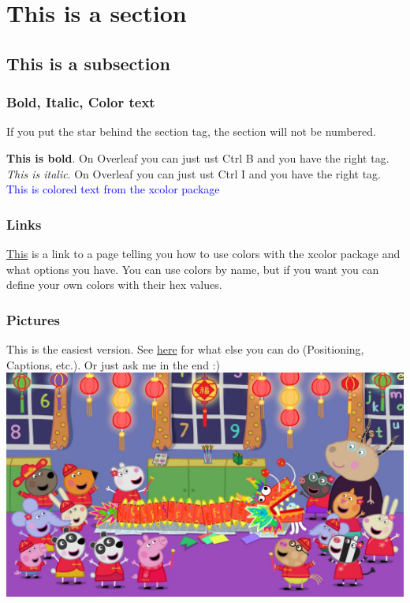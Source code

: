 \documentclass[../main.tex]{subfiles}
\begin{document}
\section{This is a section}
\subsection{This is a subsection}

\subsubsection*{Bold, Italic, Color text}

If you put the star behind the section tag, the section will not be numbered.

\textbf{This is bold}. On Overleaf you can just ust Ctrl B and you have the right tag.
\textit{This is italic}. On Overleaf you can just ust Ctrl I and you have the right tag.
\textcolor{blue}{This is colored text from the xcolor package}

\subsubsection*{Links}
 
\href{https://ftp.agdsn.de/pub/mirrors/latex/dante/macros/latex/contrib/xcolor/xcolor.pdf}{This} is a link to a page telling you how to use colors with the xcolor package and what options you have. You can use colors by name, but if you want you can define your own colors with their hex values.
 
\subsubsection*{Pictures}

This is the easiest version. See \href{https://www.overleaf.com/learn/latex/Inserting_Images}{here} for what else you can do (Positioning, Captions, etc.). Or just ask me in the end :) \\

\includegraphics[width=\textwidth]{images/peppaPig.jpg}
\end{document}
